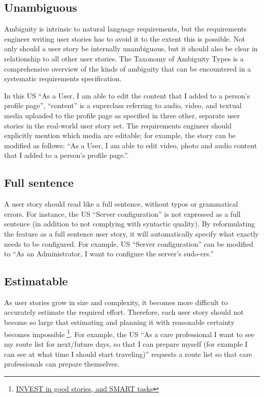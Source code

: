 \subsection*{\normalsize{Unambiguous}}
Ambiguity is intrinsic to natural language requirements, but the requirements engineer writing user stories has to avoid it to the extent this is possible. Not only should a user story be internally unambiguous, but it should also be clear in relationship to all other user stories. The Taxonomy of Ambiguity Types \cite{berry2004ambiguity} is a comprehensive overview of the kinds of ambiguity that can be encountered in a systematic requirements specification.

In this US \enquote{As a User, I am able to edit the content that I added to a person's profile page}, \enquote{content} is a superclass referring to audio, video, and textual media uploaded to the profile page as specified in three other, separate user stories in the real-world user story set. The requirements engineer should explicitly mention which media are editable; for example, the story can be modified as follows: \enquote{As a User, I am able to edit video, photo and audio content that I added to a person’s profile page.}.
\subsection*{\normalsize{Full sentence}}
A user story should read like a full sentence, without typos or grammatical errors. For instance, the US \enquote{Server configuration} is not expressed as a full sentence (in addition to not complying with syntactic quality). By reformulating the feature as a full sentence user story, it will automatically specify what exactly needs to be configured. For example, US \enquote{Server configuration} can be modified to \enquote{As an Administrator, I want to configure the server’s sudo-ers.}
\subsection*{\normalsize{Estimatable}}
As user stories grow in size and complexity, it becomes more difficult to accurately estimate the required effort. Therefore, each user story should not become so large that estimating and planning it with reasonable certainty becomes impossible \footnote{\href{http://xp123.com/articles/invest-in-good-stories-and-smart-tasks/. Accessed 2015-02-18}{INVEST in good stories, and SMART tasks}}. For example, the US \enquote{As a care professional I want to see my route list for next/future days, so that I can prepare myself (for example I can see at what time I should start traveling)} requests a route list so that care professionals can prepare themselves. 

